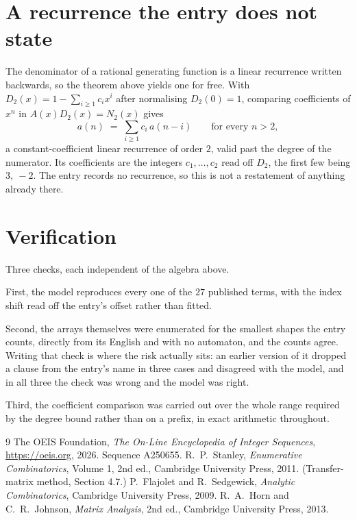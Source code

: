 \documentclass[11pt,a4paper]{article}
\theoremstyle{plain}
\theoremstyle{definition}
\begin{document}
\section{A recurrence the entry does not state}

The denominator of a rational generating function is a linear recurrence written backwards, so
the theorem above yields one for free. With $D_2(x)=1-\sum_{i\ge1}c_ix^i$ after normalising
$D_2(0)=1$, comparing coefficients of $x^n$ in $A(x)D_2(x)=N_2(x)$ gives
\[
a(n)\;=\;\sum_{i\ge1}c_i\,a(n-i)\qquad\text{for every }n>2,
\]
a constant-coefficient linear recurrence of order $2$, valid past the degree of the
numerator. Its coefficients are the integers $c_1,\dots,c_{2}$ read off $D_2$, the first few being $3,\ -2$. The entry records no recurrence, so this is not a restatement of anything
already there.

\section{Verification}

Three checks, each independent of the algebra above.

First, the model reproduces every one of the $27$ published terms, with the index shift
read off the entry's offset rather than fitted.

Second, the arrays themselves were enumerated for the smallest shapes the entry counts,
directly from its English and with no automaton, and the counts agree. Writing that check is
where the risk actually sits: an earlier version of it dropped a clause from the entry's name
in three cases and disagreed with the model, and in all three the check was wrong and the model
was right.

Third, the coefficient comparison was carried out over the whole range required by the degree
bound rather than on a prefix, in exact arithmetic throughout.

\begin{thebibliography}{9}
 The OEIS Foundation, \emph{The On-Line Encyclopedia of Integer
Sequences}, \url{https://oeis.org}, 2026. Sequence A250655.
 R.~P.~Stanley, \emph{Enumerative Combinatorics}, Volume 1, 2nd ed.,
Cambridge University Press, 2011. (Transfer-matrix method, Section 4.7.)
 P.~Flajolet and R.~Sedgewick, \emph{Analytic Combinatorics}, Cambridge
University Press, 2009.
 R.~A.~Horn and C.~R.~Johnson, \emph{Matrix Analysis}, 2nd ed., Cambridge
University Press, 2013.
\end{thebibliography}
\end{document}
